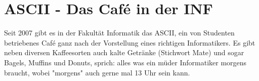 \section{ASCII - Das Café in der INF}

Seit 2007 gibt es in der Fakultät Informatik das ASCII, ein von Studenten betriebenes Café ganz nach der Vorstellung eines richtigen Informatikers. Es gibt neben diversen Kaffeesorten auch kalte Getränke (Stichwort Mate) und sogar Bagels, Muffins und Donuts, sprich: alles was ein müder Informatiker morgens braucht, wobei "morgens" auch gerne mal 13 Uhr sein kann.